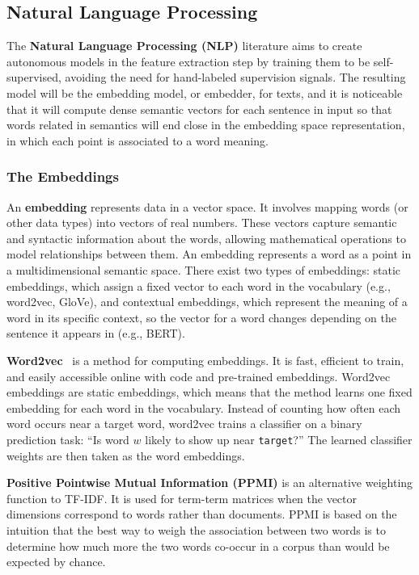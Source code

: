 \subsection{Natural Language Processing}\label{subsec:natural-language-processing}
The \textbf{Natural Language Processing (NLP)} literature aims to create autonomous models in the feature extraction step by training them to be self-supervised, avoiding the need for hand-labeled supervision signals. The resulting model will be the embedding model, or embedder, for texts, and it is noticeable that it will compute dense semantic vectors for each sentence in input so that words related in semantics will end close in the embedding space representation, in which each point is associated to a word meaning. \cite{jurafsky2025}

\subsubsection{The Embeddings}\label{subsubsec:the-embeddings}
An \textbf{embedding} represents data in a vector space. It involves mapping words (or other data types) into vectors of real numbers. These vectors capture semantic and syntactic information about the words, allowing mathematical operations to model relationships between them. An embedding represents a word as a point in a multidimensional semantic space. There exist two types of embeddings: static embeddings, which assign a fixed vector to each word in the vocabulary (e.g., word2vec, GloVe), and contextual embeddings, which represent the meaning of a word in its specific context, so the vector for a word changes depending on the sentence it appears in (e.g., BERT). \cite{jurafsky2025}

\textbf{Word2vec}~\cite{mikolovchencorradodean2013} is a method for computing embeddings. It is fast, efficient to train, and easily accessible online with code and pre-trained embeddings. Word2vec embeddings are static embeddings, which means that the method learns one fixed embedding for each word in the vocabulary. Instead of counting how often each word occurs near a target word, word2vec trains a classifier on a binary prediction task: ``Is word $w$ likely to show up near \texttt{target}?'' The learned classifier weights are then taken as the word embeddings. \cite{jurafsky2025}

\textbf{Positive Pointwise Mutual Information (PPMI)} is an alternative weighting function to TF-IDF. It is used for term-term matrices when the vector dimensions correspond to words rather than documents. PPMI is based on the intuition that the best way to weigh the association between two words is to determine how much more the two words co-occur in a corpus than would be expected by chance. \cite{jurafsky2025}

